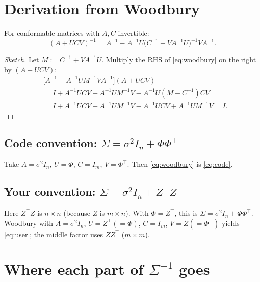 \documentclass[11pt]{article}
\newcommand{\noise}{\sigma^2}
\newcommand{\Sig}{\Sigma}
\newcommand{\Ph}{\Phi}
\newcommand{\Zmat}{Z}
\begin{document}
\section{Derivation from Woodbury}

\begin{theorem}[Woodbury]
For conformable matrices with $A,C$ invertible:
\begin{equation}
  \label{eq:woodbury}
  (A + U C V)^{-1}
  = A^{-1} - A^{-1} U \bigl(C^{-1} + V A^{-1} U\bigr)^{-1} V A^{-1}.
\end{equation}
\end{theorem}

\begin{proof}[Sketch]
Let $M := C^{-1} + V A^{-1} U$. Multiply the RHS of \eqref{eq:woodbury} on the right by $(A+UCV)$:
\[
\begin{aligned}
  &\bigl[A^{-1} - A^{-1} U M^{-1} V A^{-1}\bigr](A + U C V) \\
  &= I + A^{-1}UCV - A^{-1} U M^{-1} V - A^{-1} U (M - C^{-1}) C V \\
  &= I + A^{-1}UCV - A^{-1} U M^{-1} V - A^{-1} U C V + A^{-1} U M^{-1} V = I.
\end{aligned}
\]
\end{proof}

\subsection{Code convention: $\Sig = \noise I_n + \Ph\Ph^{\top}$}

Take $A=\noise I_n$, $U=\Ph$, $C=I_m$, $V=\Ph^{\top}$. Then \eqref{eq:woodbury} is \eqref{eq:code}.

\subsection{Your convention: $\Sig = \noise I_n + \Zmat^{\top}\Zmat$}

Here $\Zmat^{\top}\Zmat$ is $n\times n$ (because $\Zmat$ is $m\times n$).
With $\Ph=\Zmat^{\top}$, this is $\Sig=\noise I_n+\Ph\Ph^{\top}$.
Woodbury with $A=\noise I_n$, $U=\Zmat^{\top}(=\Ph)$, $C=I_m$, $V=\Zmat(=\Ph^{\top})$ yields \eqref{eq:user}; the middle factor uses $\Zmat\Zmat^{\top}$ ($m\times m$).

\section{Where each part of $\Sig^{-1}$ goes}
\label{sec:split}
\end{document}
